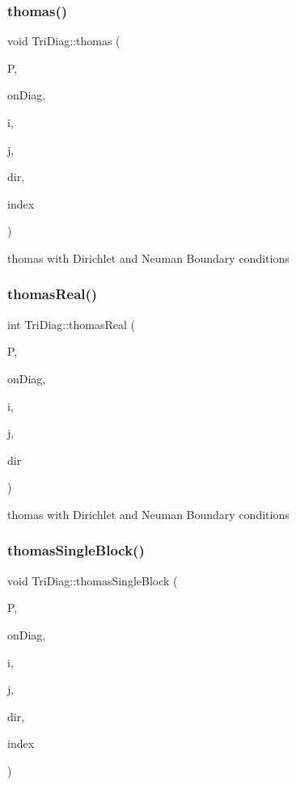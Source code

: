 \subsubsection{\texorpdfstring{thomas()}{thomas()}}
{\footnotesize\ttfamily void Tri\+Diag\+::thomas (\begin{DoxyParamCaption}\item[{\mbox{\hyperlink{classChunkedArray}{Chunked\+Array}} \&}]{P,  }\item[{double $\ast$}]{on\+Diag,  }\item[{const int}]{i,  }\item[{const int}]{j,  }\item[{const int}]{dir,  }\item[{const int}]{index }\end{DoxyParamCaption})}

thomas with Dirichlet and Neuman Boundary conditions \mbox{\label{classTriDiag_a78abac130d55f38bf370887612a04c58}} 
\subsubsection{\texorpdfstring{thomas\+Real()}{thomasReal()}}
{\footnotesize\ttfamily int Tri\+Diag\+::thomas\+Real (\begin{DoxyParamCaption}\item[{\mbox{\hyperlink{classChunkedArray}{Chunked\+Array}} \&}]{P,  }\item[{double $\ast$}]{on\+Diag,  }\item[{const int}]{i,  }\item[{const int}]{j,  }\item[{const int}]{dir }\end{DoxyParamCaption})}

thomas with Dirichlet and Neuman Boundary conditions \mbox{\label{classTriDiag_ac7707e6fa080f96d060892bfd0fa9299}} 
\subsubsection{\texorpdfstring{thomas\+Single\+Block()}{thomasSingleBlock()}}
{\footnotesize\ttfamily void Tri\+Diag\+::thomas\+Single\+Block (\begin{DoxyParamCaption}\item[{\mbox{\hyperlink{classChunkedArray}{Chunked\+Array}} \&}]{P,  }\item[{double $\ast$}]{on\+Diag,  }\item[{const int}]{i,  }\item[{const int}]{j,  }\item[{const int}]{dir,  }\item[{const int}]{index }\end{DoxyParamCaption})}

